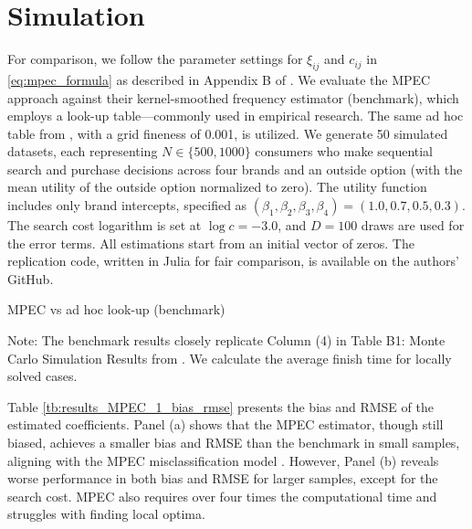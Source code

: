 \documentclass[12pt]{article}
\begin{document}
\section{Simulation}

For comparison, we follow the parameter settings for \(\xi_{ij}\) and \(c_{ij}\) in \eqref{eq:mpec_formula} as described in Appendix B of \cite{ursu2023sequential}. We evaluate the MPEC approach against their kernel-smoothed frequency estimator (benchmark), which employs a look-up table—commonly used in empirical research. The same ad hoc table from \cite{ursu2023sequential}, with a grid fineness of 0.001, is utilized.
We generate 50 simulated datasets, each representing \(N\in\{500,1000\}\) consumers who make sequential search and purchase decisions across four brands and an outside option (with the mean utility of the outside option normalized to zero). The utility function includes only brand intercepts, specified as \((\beta_1,\beta_2,\beta_3,\beta_4) = (1.0, 0.7, 0.5, 0.3)\). The search cost logarithm is set at \(\log c = -3.0\), and \(D = 100\) draws are used for the error terms. All estimations start from an initial vector of zeros. The replication code, written in Julia for fair comparison, is available on the authors' GitHub.


\begin{table}[!htbp]
  \begin{center}
      \caption{MPEC vs ad hoc look-up (benchmark)}
      \label{tb:results_MPEC_1_bias_rmse} 
      \subfloat[$N=500$]{}
      \subfloat[$N=1000$]{}
  \end{center}
  \footnotesize
  Note: The benchmark results closely replicate Column (4) in Table B1: Monte Carlo Simulation Results from \cite{ursu2023sequential}. We calculate the average finish time for locally solved cases.
\end{table} 

Table \ref{tb:results_MPEC_1_bias_rmse} presents the bias and RMSE of the estimated coefficients. Panel (a) shows that the MPEC estimator, though still biased, achieves a smaller bias and RMSE than the benchmark in small samples, aligning with the MPEC misclassification model \citep{lu2014mpec}. However, Panel (b) reveals worse performance in both bias and RMSE for larger samples, except for the search cost. MPEC also requires over four times the computational time and struggles with finding local optima.
\end{document}
